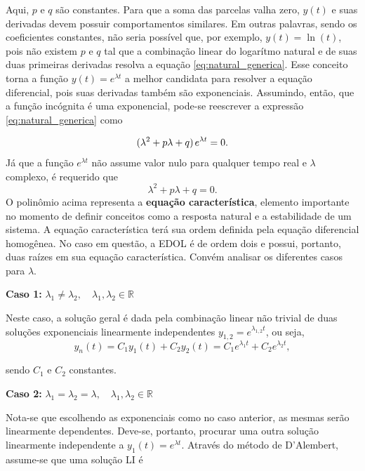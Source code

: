 \documentclass{article}
\numberwithin{equation}{section}
\newcommand{\itembull}[1]{\noindent\textbf{\small{\textbullet \hspace{1.5mm}#1}}}
\begin{document}
\noindent Aqui, $p$ e $q$ são constantes. Para que a soma das parcelas valha zero, $y(t)$ e suas derivadas devem possuir comportamentos similares. Em outras palavras, sendo os coeficientes constantes, não seria possível que, por exemplo, $y(t)=\ln(t)$, pois não existem $p$ e $q$ tal que a combinação linear do logarítmo natural e de suas duas primeiras derivadas resolva a equação \eqref{eq:natural_generica}. Esse conceito torna a função $y(t) = e^{\lambda t}$ a melhor candidata para resolver a equação diferencial, pois suas derivadas também são exponenciais. Assumindo, então, que a função incógnita é uma exponencial, pode-se reescrever a expressão \eqref{eq:natural_generica} como

\begin{equation*}
    (\lambda^{2}+p\lambda+q)\hspace{0.05cm} e^{\lambda t} = 0.
\end{equation*}
Já que a função $e^{\lambda t}$ não assume valor nulo para qualquer tempo real e $\lambda$ complexo, é requerido que
\begin{equation}
    \lambda^{2}+p\lambda+q=0.
\end{equation}
O polinômio acima representa a \textbf{equação característica}, elemento importante no momento de definir conceitos como a resposta natural e a estabilidade de um sistema. A equação característica terá sua ordem definida pela equação diferencial homogênea. No caso em questão, a EDOL é de ordem dois e possui, portanto, duas raízes em sua equação característica. Convém analisar os diferentes casos para $\lambda$.

\vspace{3mm}

\itembull{Caso 1:} $\lambda_{1} \neq \lambda_{2}, \quad \lambda_{1},\lambda_{2} \in \mathbb{R}$

Neste caso, a solução geral é dada pela combinação linear não trivial de duas soluções exponenciais linearmente independentes $y_{1,2} = e^{\lambda_{1,2}t}$, ou seja,
\begin{equation*}
    y_{n}(t)=C_1y_1(t)+C_2y_2(t) = C_1e^{\lambda_1 t}+C_2e^{\lambda_2 t},
\end{equation*}

\noindent sendo $C_1$ e $C_2$ constantes.

\itembull{Caso 2:} $\lambda_{1} = \lambda_{2} = \lambda, \quad \lambda_{1},\lambda_{2} \in \mathbb{R}$

Nota-se que escolhendo as exponenciais como no caso anterior, as mesmas serão linearmente dependentes. Deve-se, portanto, procurar uma outra solução linearmente independente a $y_{1}(t)=e^{\lambda t}$. Através do método de D'Alembert, assume-se que uma solução LI é
\end{document}
